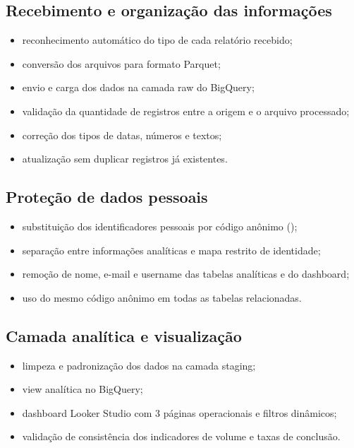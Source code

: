 \documentclass[11pt,a4paper]{article}
\begin{document}
\subsection{Recebimento e organização das informações}

\begin{itemize}
  \item reconhecimento automático do tipo de cada relatório recebido;
  \item conversão dos arquivos para formato Parquet;
  \item envio e carga dos dados na camada raw do BigQuery;
  \item validação da quantidade de registros entre a origem e o arquivo processado;
  \item correção dos tipos de datas, números e textos;
  \item atualização sem duplicar registros já existentes.
\end{itemize}

\subsection{Proteção de dados pessoais}

\begin{itemize}
  \item substituição dos identificadores pessoais por código anônimo ();
  \item separação entre informações analíticas e mapa restrito de identidade;
  \item remoção de nome, e-mail e username das tabelas analíticas e do dashboard;
  \item uso do mesmo código anônimo em todas as tabelas relacionadas.
\end{itemize}

\subsection{Camada analítica e visualização}

\begin{itemize}
  \item limpeza e padronização dos dados na camada staging;
  \item view analítica  no BigQuery;
  \item dashboard Looker Studio com 3 páginas operacionais e filtros dinâmicos;
  \item validação de consistência dos indicadores de volume e taxas de conclusão.
\end{itemize}
\end{document}
